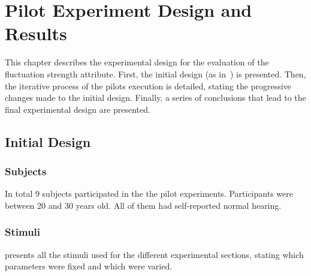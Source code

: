 \documentclass[../main.tex]{subfiles}
\begin{document}
\chapter{Pilot Experiment Design and Results}
\label{cha:pilot}

This chapter describes the experimental design for the evaluation of the
fluctuation strength attribute. First, the initial design (as
in~\cite{Fastl1982Fluctuation}) is presented. Then, the iterative process of the
pilots execution is detailed, stating the progressive changes made to the
initial design. Finally, a series of conclusions that lead to the final
experimental design are presented.

\section{Initial Design}

\subsection{Subjects}

In total 9 subjects participated in the the pilot experiments. Participants were
between 20 and 30 years old. All of them had self-reported normal hearing.

\subsection{Stimuli}
\label{subsec:pilot_stimuli}

 presents all the stimuli used for the different
experimental sections, stating which parameters were fixed and which were
varied.
\end{document}
